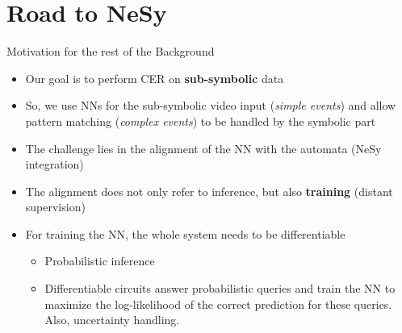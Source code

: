 \documentclass[10pt, aspectratio=169]{beamer}
\begin{document}
\section{Road to NeSy}
{
    \begin{frame}
        \sectionpage%
    \end{frame}
}

\begin{frame}{Motivation for the rest of the Background}
    \begin{itemize}
        \setlength{\itemsep}{12pt}
        \item Our goal is to perform CER on \textbf{sub-symbolic} data%
        \item So, we use NNs for the sub-symbolic video input (\textit{simple events}) and allow pattern matching (\textit{complex events}) to be handled by the symbolic part
        \item The challenge lies in the alignment of the NN with the automata (\textcolor{umBlueLighter}{NeSy integration})
        \item The alignment does not only refer to inference, but also \textbf{training} (distant supervision)
        \item For training the NN, the whole system needs to be differentiable
        \vspace{0.6em}
            \begin{itemize}
            \setlength{\itemsep}{4pt}
                \item {}  Probabilistic inference
                \item {}  Differentiable circuits answer probabilistic queries and train the NN to maximize the log-likelihood of the correct prediction for these queries.
            Also, uncertainty handling.
            \end{itemize}
    \end{itemize}
\end{frame}
\end{document}
